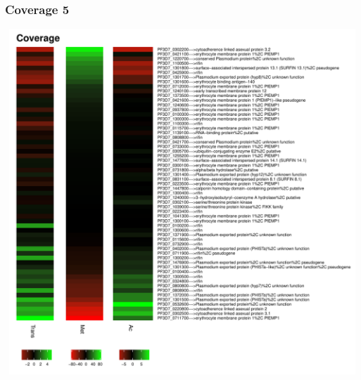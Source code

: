 \documentclass{article}\usepackage[]{graphicx}\usepackage[]{color}
\newenvironment{knitrout}{}{} %
\begin{document}
\subsubsection{Coverage 5}
\begin{knitrout}
\color{fgcolor}

{\centering \includegraphics[width=20cm,height=13cm]{figure/minimal-met_cov_5-1} 

}



\end{knitrout}
\clearpage
\end{document}
